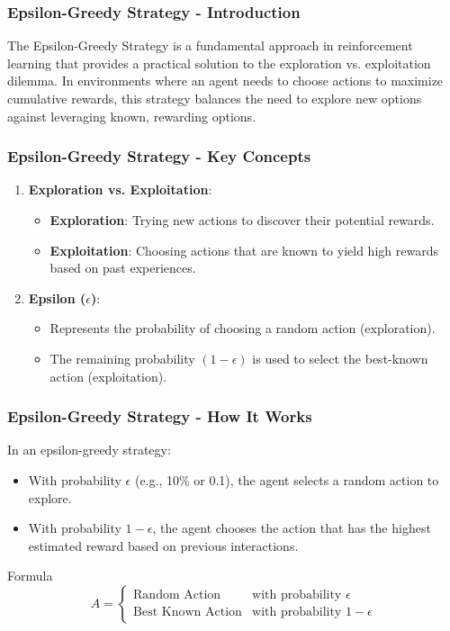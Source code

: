 \documentclass[aspectratio=169]{beamer}
\begin{document}
\begin{frame}[fragile]
    \frametitle{Epsilon-Greedy Strategy - Introduction}
    The Epsilon-Greedy Strategy is a fundamental approach in reinforcement learning that provides a practical solution to the exploration vs. exploitation dilemma. In environments where an agent needs to choose actions to maximize cumulative rewards, this strategy balances the need to explore new options against leveraging known, rewarding options.
\end{frame}

\begin{frame}[fragile]
    \frametitle{Epsilon-Greedy Strategy - Key Concepts}
    \begin{enumerate}
        \item \textbf{Exploration vs. Exploitation}:
        \begin{itemize}
            \item \textbf{Exploration}: Trying new actions to discover their potential rewards.
            \item \textbf{Exploitation}: Choosing actions that are known to yield high rewards based on past experiences.
        \end{itemize}
        \item \textbf{Epsilon (\(\epsilon\))}:
        \begin{itemize}
            \item Represents the probability of choosing a random action (exploration).
            \item The remaining probability \( (1 - \epsilon) \) is used to select the best-known action (exploitation).
        \end{itemize}
    \end{enumerate}
\end{frame}

\begin{frame}[fragile]
    \frametitle{Epsilon-Greedy Strategy - How It Works}
    In an epsilon-greedy strategy:
    \begin{itemize}
        \item With probability \(\epsilon\) (e.g., 10\% or 0.1), the agent selects a random action to explore.
        \item With probability \(1 - \epsilon\), the agent chooses the action that has the highest estimated reward based on previous interactions.
    \end{itemize}
    
    \begin{block}{Formula}
        \begin{equation}
        A = 
        \begin{cases} 
        \text{Random Action} & \text{with probability } \epsilon \\ 
        \text{Best Known Action} & \text{with probability } 1 - \epsilon 
        \end{cases}
        \end{equation}
    \end{block}
\end{frame}
\end{document}
